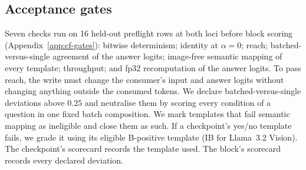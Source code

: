 \subsection{Acceptance gates}
\label{sec:gates}

Seven checks run on 16 held-out preflight rows at both loci before block scoring (Appendix~\ref{app:cf-gates}): bitwise determinism; identity at $\alpha=0$; reach; batched-versus-single agreement of the answer logits; image-free semantic mapping of every template; throughput; and fp32 recomputation of the answer logits. To pass reach, the write must change the consumer's input and answer logits without changing anything outside the consumed tokens. We declare batched-versus-single deviations above $0.25$ and neutralise them by scoring every condition of a question in one fixed batch composition. We mark templates that fail semantic mapping as ineligible and close them as such. If a checkpoint's yes/no template fails, we grade it using its eligible B-positive template (IB for Llama~3.2 Vision). The checkpoint's scorecard records the template used. The block's scorecard records every declared deviation.